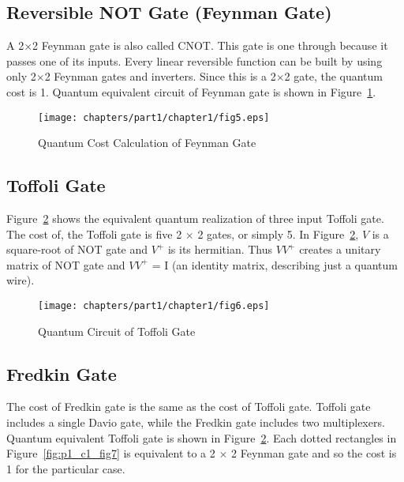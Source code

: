 \subsection{Reversible NOT Gate (Feynman Gate)}

\begin{example}\textnormal{
	A 2$\times$2 Feynman gate is also called CNOT. This gate is one through because it passes one of its inputs. Every linear reversible function can be built by using only 2$\times$2 Feynman gates and inverters. Since this is a 2$\times$2 gate, the quantum cost is 1. Quantum equivalent circuit of Feynman gate is shown in Figure~\ref{fig:p1_c1_fig5}.}
\end{example}

\begin{figure}[h]
	\centering
	\texttt{[image: chapters/part1/chapter1/fig5.eps]}
	\caption{Quantum Cost Calculation of Feynman Gate}
	\label{fig:p1_c1_fig5}
\end{figure}

\subsection{Toffoli Gate}
	Figure~\ref{fig:p1_c1_fig6} shows the equivalent quantum realization of three input Toffoli gate. The cost of, the Toffoli gate is five 2 $\times$ 2 gates, or simply 5. In Figure~\ref{fig:p1_c1_fig6}, $V$ is a square-root of NOT gate and $V^+$ is its hermitian. Thus $V V^+$ creates a unitary matrix of NOT gate and $V V^+$ = I (an identity matrix, describing just a quantum wire).
	
	\begin{figure}[h]
		\centering
		\texttt{[image: chapters/part1/chapter1/fig6.eps]}
		\caption{Quantum Circuit of Toffoli Gate}
		\label{fig:p1_c1_fig6}
	\end{figure}

\subsection{Fredkin Gate}
The cost of Fredkin gate is the same as the cost of Toffoli gate. Toffoli gate includes a single Davio gate, while the Fredkin gate includes two multiplexers. Quantum equivalent Toffoli gate is shown in Figure~\ref{fig:p1_c1_fig6}. Each dotted rectangles in Figure~\ref{fig:p1_c1_fig7} is equivalent to a 2 $\times$ 2 Feynman gate and so the cost is 1 for the particular case.

